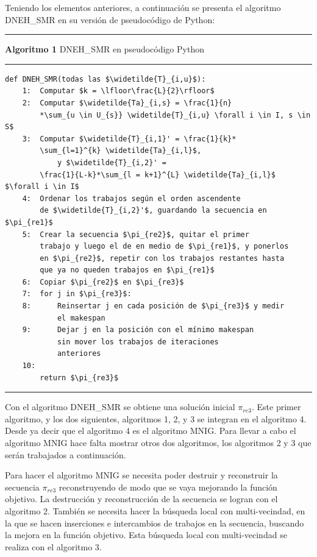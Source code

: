 \documentclass{article}
\begin{document}
\vspace{\baselineskip}
Teniendo los elementos anteriores, a continuación se presenta el algoritmo
DNEH\_SMR en su versión de pseudocódigo de Python:

\pagebreak

\noindent\noindent
\rule{\linewidth}{0.4pt}

\textbf{Algoritmo 1} DNEH\_SMR en pseudocódigo Python

\noindent\noindent
\rule{\linewidth}{0.4pt}
    
\begin{lstlisting}[mathescape=true]
    def DNEH_SMR(todas las $\widetilde{T}_{i,u}$):
    1:  Computar $k = \lfloor\frac{L}{2}\rfloor$
    2:  Computar $\widetilde{Ta}_{i,s} = \frac{1}{n}
        *\sum_{u \in U_{s}} \widetilde{T}_{i,u} \forall i \in I, s \in S$
    3:  Computar $\widetilde{T}_{i,1}' = \frac{1}{k}*
        \sum_{l=1}^{k} \widetilde{Ta}_{i,l}$, 
            y $\widetilde{T}_{i,2}' = 
        \frac{1}{L-k}*\sum_{l = k+1}^{L} \widetilde{Ta}_{i,l}$ $\forall i \in I$
    4:  Ordenar los trabajos según el orden ascendente 
        de $\widetilde{T}_{i,2}'$, guardando la secuencia en $\pi_{re1}$
    5:  Crear la secuencia $\pi_{re2}$, quitar el primer 
        trabajo y luego el de en medio de $\pi_{re1}$, y ponerlos
        en $\pi_{re2}$, repetir con los trabajos restantes hasta
        que ya no queden trabajos en $\pi_{re1}$
    6:  Copiar $\pi_{re2}$ en $\pi_{re3}$
    7:  for j in $\pi_{re3}$:
    8:      Reinsertar j en cada posición de $\pi_{re3}$ y medir
            el makespan
    9:      Dejar j en la posición con el mínimo makespan
            sin mover los trabajos de iteraciones
            anteriores
    10: 
        return $\pi_{re3}$
\end{lstlisting}

\noindent\noindent
\rule{\textwidth}{0.4pt}

\vspace{\baselineskip}
Con el algoritmo DNEH\_SMR se obtiene una solución inicial $\pi_{re3}$. Este primer
algoritmo, y los dos siguientes, algoritmos 1, 2, y 3 se integran en el algoritmo 4.
Desde ya decir que el algoritmo 4 es el algoritmo MNIG. Para llevar a cabo el
algoritmo MNIG hace falta mostrar otros dos algoritmos, los algoritmos 2 y 3 que
serán trabajados a continuación.

\vspace{\baselineskip}
Para hacer el algoritmo MNIG se necesita poder destruir y reconstruir la secuencia
$\pi_{re3}$ reconstruyendo de modo que se vaya mejorando la función objetivo. La
destrucción y reconstrucción de la secuencia se logran con el algoritmo 2. También
se necesita hacer la búsqueda local con multi-vecindad, en la que se hacen 
inserciones e intercambios de trabajos en la secuencia, buscando la mejora en la
función objetivo. Esta búsqueda local con multi-vecindad se realiza con el
algoritmo 3. \autocite{algMNIG}
\end{document}
